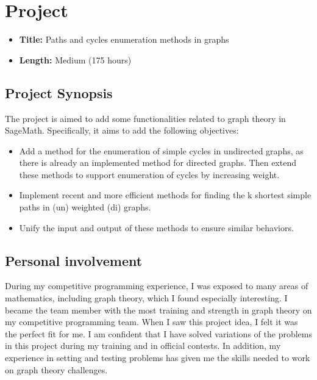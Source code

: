 \section{Project}

\begin{itemize}
  \item \textbf{Title:} Paths and cycles enumeration methods in graphs
  \item \textbf{Length:} Medium (175 hours)
\end{itemize}

\subsection{Project Synopsis}
The project is aimed to add some functionalities related to graph theory in
SageMath. Specifically, it aims to add the following objectives:

\begin{itemize}
  \item Add a method for the enumeration of simple cycles in undirected graphs, as
        there is already an implemented method for directed graphs. Then extend these
        methods to support enumeration of cycles by increasing weight.
  \item Implement recent and more efficient methods for finding the k shortest simple
        paths in (un) weighted (di) graphs.
  \item Unify the input and output of these methods to ensure similar behaviors.
\end{itemize}

\subsection{Personal involvement}
During my competitive programming experience, I was exposed to many areas of
mathematics, including graph theory, which I found especially interesting. I
became the team member with the most training and strength in graph theory on
my competitive programming team. When I saw this project idea, I felt it was
the perfect fit for me. I am confident that I have solved variations of the
problems in this project during my training and in official contests. In
addition, my experience in setting and testing problems has given me the skills
needed to work on graph theory challenges.

